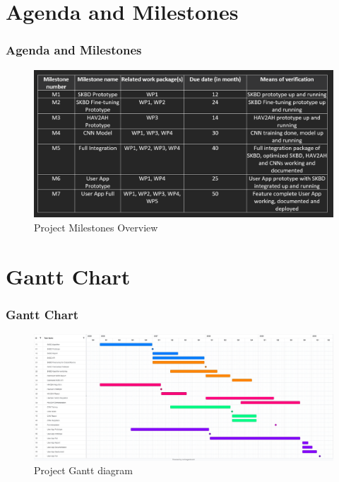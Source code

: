 \documentclass{beamer}
\begin{document}
\section{Agenda and Milestones}
\begin{frame}
\frametitle{Agenda and Milestones}
\begin{figure}[htbp]
    \centering
    \includegraphics[width=1\textwidth]{images/milestones.png}
    \caption{Project Milestones Overview}
    \label{fig:milestones}
\end{figure}
\end{frame}

\section{Gantt Chart}
\begin{frame}
\frametitle{Gantt Chart}
\begin{figure}[htbp]
    \centering
    \includegraphics[width=1\textwidth]{images/gant.jpg}
    \caption{Project Gantt diagram}
    \label{fig:gantt}
\end{figure}

\end{frame}
\end{document}
